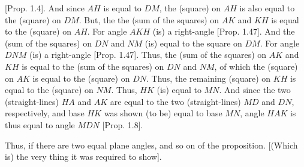 \begin{Parallel}{}{}
{[Prop. 1.4]. 
And since $AH$ is equal to $DM$, the (square) on $AH$ is also equal
to the (square) on $DM$. But, the the (sum of the squares) on $AK$ and $KH$ is equal to the (square) on $AH$. For angle $AKH$
(is) a right-angle [Prop. 1.47]. And the (sum of the 
squares) on $DN$ and
$NM$ (is) equal to the square
on $DM$. For angle $DNM$ (is) a right-angle [Prop. 1.47]. Thus, the (sum of the squares) on $AK$ and
$KH$ is equal to the (sum of the squares) on $DN$ and $NM$, of
which the (square) on $AK$ is equal to the (square) on $DN$. Thus, the
remaining (square) on $KH$ is equal to the (square) on $NM$. Thus,
$HK$ (is) equal to $MN$. And since the two (straight-lines) $HA$ and
$AK$ are equal to the two (straight-lines) $MD$ and $DN$, respectively,
and base $HK$ was shown (to be) equal to base $MN$,  angle
$HAK$ is thus equal to angle $MDN$ [Prop. 1.8].

Thus, if there are two equal plane angles, and so on of the proposition. [(Which is) the very thing it was required to show].}
\end{Parallel}

\begin{Parallel}{}{}

\end{Parallel}

